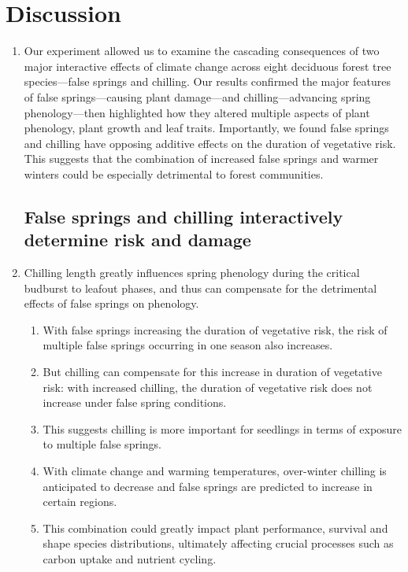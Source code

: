 \documentclass{article}\usepackage[]{graphicx}\usepackage[]{color}
\begin{document}
\section*{Discussion} 
\begin{enumerate}
\item Our experiment allowed us to examine the cascading consequences of two major interactive effects of climate change across eight deciduous forest tree species---false springs and chilling. Our results confirmed the major features of false springs---causing plant damage---and chilling---advancing spring phenology---then highlighted how they altered multiple aspects of plant phenology, plant growth and leaf traits. Importantly, we found false springs and chilling have opposing additive effects on the duration of vegetative risk. This suggests that the combination of increased false springs and warmer winters could be especially detrimental to forest communities. 

\subsection*{False springs and chilling interactively determine risk and damage}
\item Chilling length greatly influences spring phenology during the critical budburst to leafout phases, and thus can compensate for the detrimental effects of false springs on phenology.
  \begin{enumerate}
  \item With false springs increasing the duration of vegetative risk, the risk of multiple false springs occurring in one season also increases. 
  \item But chilling can compensate for this increase in duration of vegetative risk: with increased chilling, the duration of vegetative risk does not increase under false spring conditions.
  \item This suggests chilling is more important for seedlings in terms of exposure to multiple false springs.
  \item With climate change and warming temperatures, over-winter chilling is anticipated to decrease and false springs are predicted to increase in certain regions.
  \item This combination could greatly impact plant performance, survival and shape species distributions, ultimately affecting crucial processes such as carbon uptake and nutrient cycling.
  \end{enumerate}
  

\end{enumerate}
\end{document}
